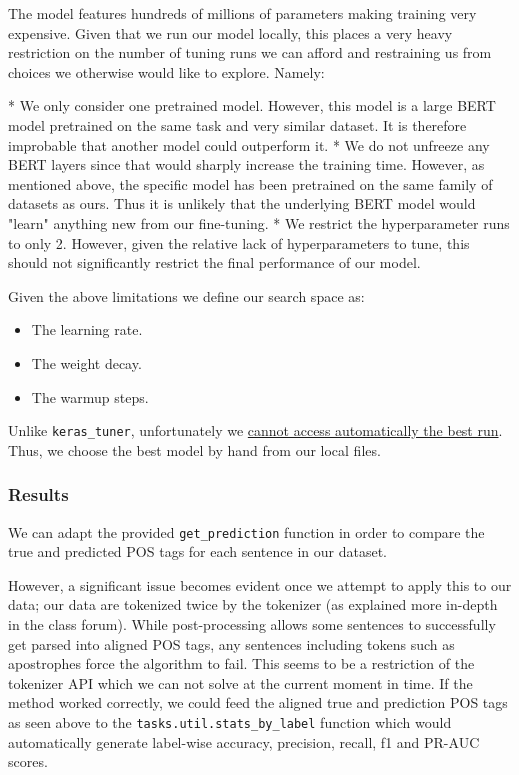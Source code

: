 \documentclass[10pt, a4paper]{article}
\def\code#1{\texttt{#1}}
\begin{document}
	
	The model features hundreds of millions of parameters making training very expensive. Given that we run our model locally, this places a very heavy restriction on the number of tuning runs we can afford and restraining us from choices we otherwise would like to explore. Namely:
	
	* We only consider one pretrained model. However, this model is a large BERT model pretrained on the same task and very similar dataset. It is therefore improbable that another model could outperform it.
	* We do not unfreeze any BERT layers since that would sharply increase the training time. However, as mentioned above, the specific model has been pretrained on the same family of datasets as ours. Thus it is unlikely that the underlying BERT model would "learn" anything new from our fine-tuning.
	* We restrict the hyperparameter runs to only 2. However, given the relative lack of hyperparameters to tune, this should not significantly restrict the final performance of our model.
	
	Given the above limitations we define our search space as:
	\begin{itemize}
		\item The learning rate.
		\item The weight decay.
		\item The warmup steps.
	\end{itemize}
	
	Unlike \code{keras\_tuner}, unfortunately we \href{https://discuss.huggingface.co/t/oserror-unable-to-load-weights-from-pytorch-checkpoint-file/3406}{cannot access automatically the best run}. Thus, we choose the best model by hand from our local files.
	
	\subsubsection{Results}
	
	We can adapt the provided \code{get\_prediction} function in order to compare the true and predicted POS tags for each sentence in our dataset. 
	
	However, a significant issue becomes evident once we attempt to apply this to our data; our data are tokenized twice by the tokenizer (as explained more in-depth in the class forum). While post-processing allows some sentences to successfully get parsed into aligned POS tags, any sentences including tokens such as apostrophes force the algorithm to fail. This seems to be a restriction of the tokenizer API which we can not solve at the current moment in time. If the method worked correctly, we could feed the aligned true and prediction POS tags as seen above to the \code{tasks.util.stats\_by\_label} function which would automatically generate label-wise accuracy, precision, recall, f1 and PR-AUC scores.
	
\end{document}
